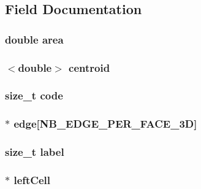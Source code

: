 \subsection{Field Documentation}
\hypertarget{classFVFace3D_ae517bffd82b9428b4f1d9500ea01c04f}{
\subsubsection[{area}]{\setlength{\rightskip}{0pt plus 5cm}double {\bf area}}}
\label{de/df5/classFVFace3D_ae517bffd82b9428b4f1d9500ea01c04f}
\hypertarget{classFVFace3D_af0e77c00d990c1a712cf032be1bb8f0f}{
\subsubsection[{centroid}]{$<$double$>$ {\bf centroid}}}
\label{de/df5/classFVFace3D_af0e77c00d990c1a712cf032be1bb8f0f}
\hypertarget{classFVFace3D_acf258c3b3328a96e3ee1e3b875b7874f}{
\subsubsection[{code}]{\setlength{\rightskip}{0pt plus 5cm}size\_\-t {\bf code}}}
\label{de/df5/classFVFace3D_acf258c3b3328a96e3ee1e3b875b7874f}
\hypertarget{classFVFace3D_a68ec0a4d9b6476bcf7e6da7dc19d4b75}{
\subsubsection[{edge}]{$\ast$ {\bf edge}\mbox{[}NB\_\-EDGE\_\-PER\_\-FACE\_\-3D\mbox{]}}}
\label{de/df5/classFVFace3D_a68ec0a4d9b6476bcf7e6da7dc19d4b75}
\hypertarget{classFVFace3D_a1ec973463c76e6d9e91160720959ad68}{
\subsubsection[{label}]{\setlength{\rightskip}{0pt plus 5cm}size\_\-t {\bf label}}}
\label{de/df5/classFVFace3D_a1ec973463c76e6d9e91160720959ad68}
\hypertarget{classFVFace3D_a21a17acd25e8b790315d31bb141824f8}{
\subsubsection[{leftCell}]{$\ast$ {\bf leftCell}}}
